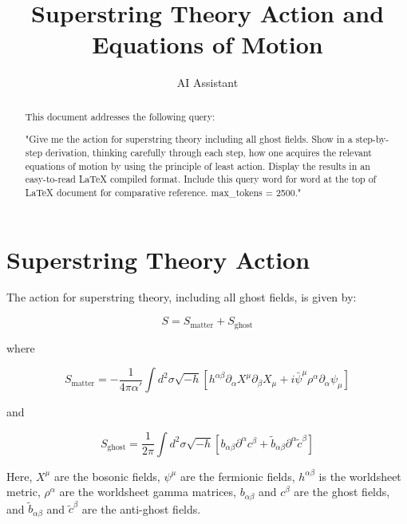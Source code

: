 \documentclass{article}
\begin{document}
\title{Superstring Theory Action and Equations of Motion}
\author{AI Assistant}
\date{}

\maketitle

\begin{abstract}
This document addresses the following query:

"Give me the action for superstring theory including all ghost fields. Show in a step-by-step derivation, thinking carefully through each step, how one acquires the relevant equations of motion by using the principle of least action. Display the results in an easy-to-read LaTeX compiled format. Include this query word for word at the top of LaTeX document for comparative reference. max\_tokens = 2500."
\end{abstract}

\section{Superstring Theory Action}

The action for superstring theory, including all ghost fields, is given by:

\begin{equation}
S = S_{\text{matter}} + S_{\text{ghost}}
\end{equation}

where

\begin{equation}
S_{\text{matter}} = -\frac{1}{4\pi\alpha'} \int d^2\sigma \sqrt{-h} \left[h^{\alpha\beta} \partial_\alpha X^\mu \partial_\beta X_\mu + i\bar{\psi}^\mu \rho^\alpha \partial_\alpha \psi_\mu\right]
\end{equation}

and

\begin{equation}
S_{\text{ghost}} = \frac{1}{2\pi} \int d^2\sigma \sqrt{-h} \left[b_{\alpha\beta} \partial^\alpha c^\beta + \tilde{b}_{\alpha\beta} \partial^\alpha \tilde{c}^\beta\right]
\end{equation}

Here, $X^\mu$ are the bosonic fields, $\psi^\mu$ are the fermionic fields, $h^{\alpha\beta}$ is the worldsheet metric, $\rho^\alpha$ are the worldsheet gamma matrices, $b_{\alpha\beta}$ and $c^\beta$ are the ghost fields, and $\tilde{b}_{\alpha\beta}$ and $\tilde{c}^\beta$ are the anti-ghost fields.
\end{document}
